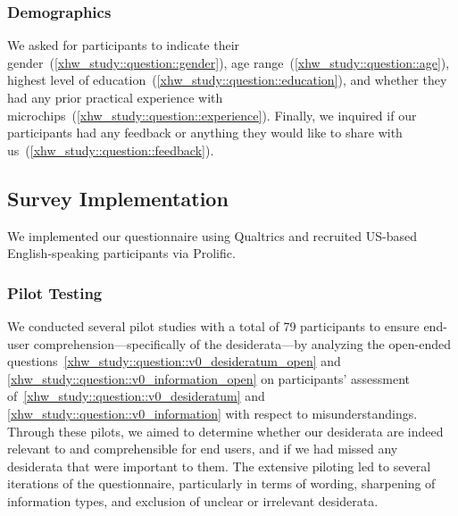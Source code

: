 \subsubsection{Demographics}
We asked for participants to indicate their gender~(\autoref{xhw_study::question::gender}), age range~(\autoref{xhw_study::question::age}), highest level of education~(\autoref{xhw_study::question::education}), and whether they had any prior practical experience with microchips~(\autoref{xhw_study::question::experience}).
Finally, we inquired if our participants had any feedback or anything they would like to share with us~(\autoref{xhw_study::question::feedback}).

\subsection{Survey Implementation}
\label{xhw_study::subsec::implementation}
We implemented our questionnaire using Qualtrics and recruited US-based English-speaking participants via Prolific.

\subsubsection{Pilot Testing} 
We conducted several pilot studies with a total of 79 participants to ensure end-user comprehension---specifically of the desiderata---by analyzing the open-ended questions~\autoref{xhw_study::question::v0_desideratum_open} and \autoref{xhw_study::question::v0_information_open} on participants' assessment of~\autoref{xhw_study::question::v0_desideratum} and \autoref{xhw_study::question::v0_information} with respect to misunderstandings.
Through these pilots, we aimed to determine whether our desiderata are indeed relevant to and comprehensible for end users, and if we had missed any desiderata that were important to them.
The extensive piloting led to several iterations of the questionnaire, particularly in terms of wording, sharpening of information types, and exclusion of unclear or irrelevant desiderata.

